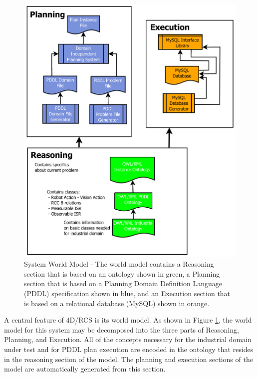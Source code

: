 \begin{figure}[htb!]
\begin{center}
\includegraphics[width=12cm]{images/WorldModel.jpg}
\caption{System World Model - The world model contains a Reasoning section that is based on an ontology shown in green,
a Planning section that is based on a Planning Domain Definition Language (PDDL) specification shown in blue, and an Execution section that is based on a relational database (MySQL) shown in orange.}
\label{fig:WorldModel}
\end{center}
\end{figure}
%
A central feature of 4D/RCS is its world model. As shown in Figure \ref{fig:WorldModel},
the world model for this system may be decomposed into the three parts of
Reasoning, Planning, and Execution. All of the concepts necessary for the industrial
domain under test and for PDDL plan execution are encoded in the ontology that resides in the reasoning section of the model. The planning and execution sections of the model are automatically generated from this section.
%
